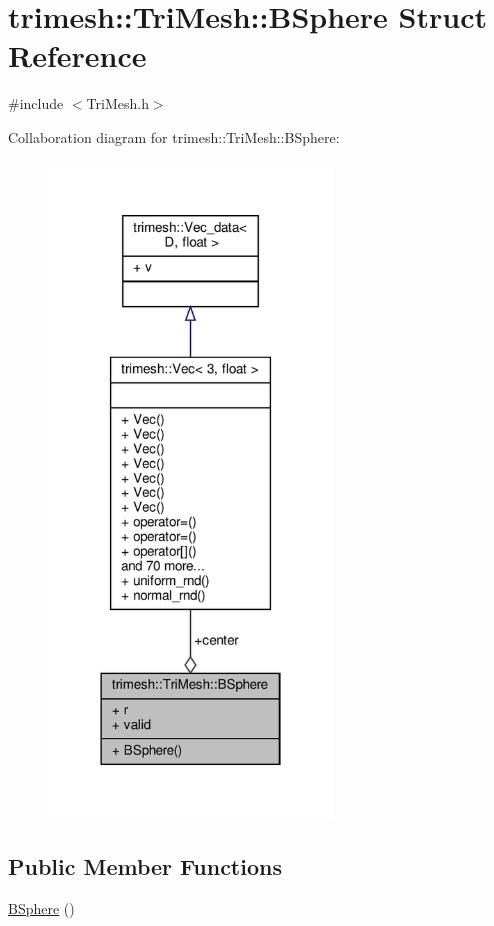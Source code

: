 \hypertarget{structtrimesh_1_1TriMesh_1_1BSphere}{}\section{trimesh\+:\+:Tri\+Mesh\+:\+:B\+Sphere Struct Reference}
\label{structtrimesh_1_1TriMesh_1_1BSphere}


{\ttfamily \#include $<$Tri\+Mesh.\+h$>$}



Collaboration diagram for trimesh\+:\+:Tri\+Mesh\+:\+:B\+Sphere\+:\nopagebreak
\begin{figure}[H]
\begin{center}
\leavevmode
\includegraphics[width=214pt]{dd/dcf/structtrimesh_1_1TriMesh_1_1BSphere__coll__graph}
\end{center}
\end{figure}
\subsection*{Public Member Functions}
\begin{DoxyCompactItemize}
\item 
\hyperlink{structtrimesh_1_1TriMesh_1_1BSphere_acb25debfbc4ba199c73f1dd8b802e9d9}{B\+Sphere} ()
\end{DoxyCompactItemize}
